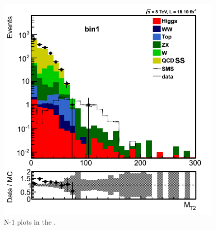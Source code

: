 \begin{figure}[!Hhtb]
\includegraphics[angle=0,scale=0.35]{TauTauFigs/MT2_bin1_14nov.png} 
\caption{N-1 plots in the \binone.}
\label{fig:bin1}
\end{figure}

